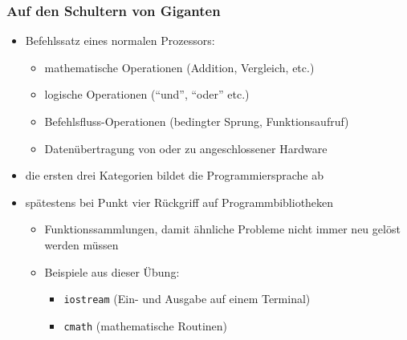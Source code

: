     \begin{frame}
        \frametitle{Auf den Schultern von Giganten}
        \begin{itemize}
            \item Befehlssatz eines normalen Prozessors:
            \begin{itemize}
                \pause
                \item mathematische Operationen (Addition, Vergleich, etc.)
                \pause
                \item logische Operationen ("`und"', "`oder"' etc.)
                \pause
                \item Befehlsfluss-Operationen (bedingter Sprung, Funktionsaufruf)
                \pause
                \item Datenübertragung von oder zu angeschlossener Hardware
            \end{itemize}
            \pause
            \item die ersten drei Kategorien bildet die Programmiersprache ab
            \item spätestens bei Punkt vier Rückgriff auf Programmbibliotheken
            \pause
            \begin{itemize}
                \item Funktionssammlungen, damit ähnliche Probleme nicht immer neu
                gelöst werden müssen
                \pause
                \item Beispiele aus dieser Übung:
                \begin{itemize}
                    \item \texttt{iostream} (Ein- und Ausgabe auf einem
                Terminal)
                    \item \texttt{cmath} (mathematische Routinen)
                \end{itemize}
            \end{itemize}
        \end{itemize}
    \end{frame}

